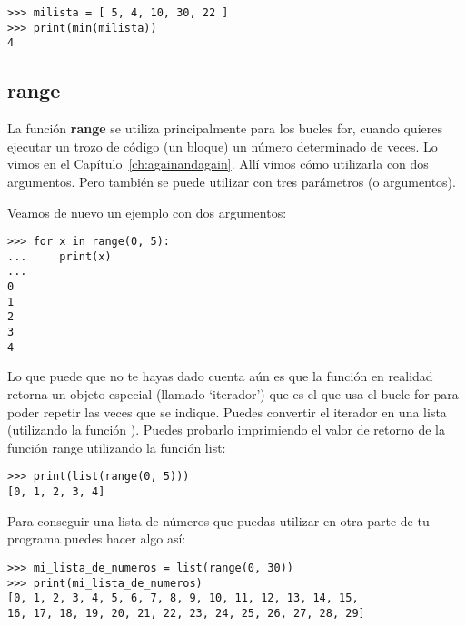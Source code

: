 \begin{listing}
\begin{listing}
\begin{verbatim}
>>> milista = [ 5, 4, 10, 30, 22 ]
>>> print(min(milista))
4
\end{verbatim}
\end{listing}

\subsection*{range}

La función \textbf{range} se utiliza principalmente para los bucles for, cuando quieres ejecutar un trozo de código (un bloque) un número determinado de veces.   Lo vimos en el Capítulo~\ref{ch:againandagain}. Allí vimos cómo utilizarla con dos argumentos. Pero también se puede utilizar con tres parámetros (o argumentos).

Veamos de nuevo un ejemplo con dos argumentos:

\begin{listing}
\begin{verbatim}
>>> for x in range(0, 5):
...     print(x)
... 
0
1
2
3
4
\end{verbatim}
\end{listing}

\noindent
Lo que puede que no te hayas dado cuenta aún es que la función  en realidad retorna un objeto especial (llamado `iterador') que es el que usa el bucle for para poder repetir las veces que se indique.  Puedes convertir el iterador en una lista (utilizando la función ). Puedes probarlo imprimiendo el valor de retorno de la función range utilizando la función list:

\begin{listing}
\begin{verbatim}
>>> print(list(range(0, 5)))
[0, 1, 2, 3, 4]
\end{verbatim}
\end{listing}

\noindent
Para conseguir una lista de números que puedas utilizar en otra parte de tu programa puedes hacer algo así:

\begin{listingignore}
\begin{verbatim}
>>> mi_lista_de_numeros = list(range(0, 30))
>>> print(mi_lista_de_numeros)
[0, 1, 2, 3, 4, 5, 6, 7, 8, 9, 10, 11, 12, 13, 14, 15, 
16, 17, 18, 19, 20, 21, 22, 23, 24, 25, 26, 27, 28, 29]
\end{verbatim}
\end{listingignore}


\end{listing}
